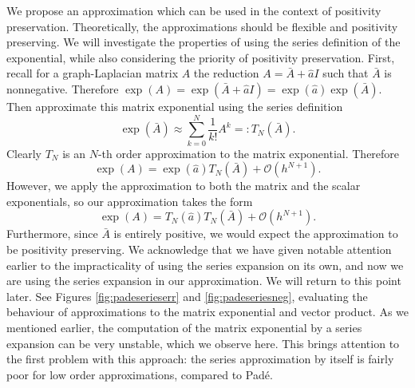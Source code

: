 We propose an approximation which can be used in the context of positivity preservation.
Theoretically, the approximations should be flexible and positivity preserving.
We will investigate the properties of using the series definition of the exponential, while also considering the priority of positivity preservation.
First, recall for a graph-Laplacian matrix $A$ the reduction $A = \bar{A} + \hat{a}I$ such that $\bar{A}$ is nonnegative.
Therefore $\exp(A) = \exp(\bar{A} + \hat{a}I) = \exp(\hat{a})\exp(\bar{A})$.
Then approximate this matrix exponential using the series definition
\begin{equation*}
    \exp(\bar{A}) \approx \sum_{k=0}^{N} \frac{1}{k!}A^k =: T_N(\bar{A}).
\end{equation*}
Clearly $T_N$ is an $N$-th order approximation to the matrix exponential.
Therefore
\begin{equation*}
    \exp(A) = \exp(\hat{a})T_N(\bar{A}) + \mathcal{O}(h^{N+1}).
\end{equation*}
However, we apply the approximation to both the matrix and the scalar exponentials, so our approximation takes the form
\begin{equation}
    \exp(A) = T_N(\hat{a})T_N(\bar{A}) + \mathcal{O}(h^{N+1}).
\end{equation}
Furthermore, since $\bar{A}$ is entirely positive, we would expect the approximation to be positivity preserving.
We acknowledge that we have given notable attention earlier to the impracticality of using the series expansion on its own, and now we are using the series expansion in our approximation.
We will return to this point later.
See Figures \ref{fig:padeserieserr} and \ref{fig:padeseriesneg}, evaluating the behaviour of approximations to the matrix exponential and vector product.
As we mentioned earlier, the computation of the matrix exponential by a series expansion can be very unstable,
which we observe here.
This brings attention to the first problem with this approach: the series approximation by itself is fairly poor for low order approximations, compared to Pad\'e. %

